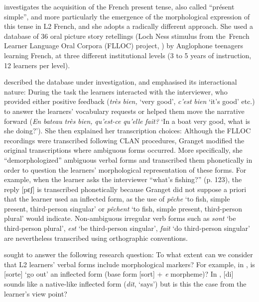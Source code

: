 \documentclass[output=paper,colorlinks,citecolor=brown,modfonts,nonflat]{../langscibook}
\begin{document}
 \citet{Granget2015} investigates the acquisition of the French present tense, also called “présent simple”, and more particularly the emergence of the morphological expression of this tense in L2 French, and she adopts a radically different approach. She used a database of 36 oral picture story retellings (Loch Ness stimulus from the~French Learner Language Oral Corpora (FLLOC) project, \citealt{MarsdenEtAl2002}) by Anglophone teenagers learning French, at three different institutional levels (3 to 5 years of instruction, 12 learners per level). 

\citet{Granget2015} described the database under investigation, and emphasised its interactional nature: During the task the learners interacted with the interviewer, who provided either positive feedback (\textit{très} \textit{bien,} ‘very good’, \textit{c’est} \textit{bien} ‘it’s good’ etc.) to answer the learners’ vocabulary requests or helped them move the narrative forward (\textit{En} \textit{bateau} \textit{très} \textit{bien,} \textit{qu’est-ce} \textit{qu’elle} \textit{fait?} ‘In a boat very good, what is she doing?’). She then explained her transcription choices: Although the FLLOC recordings were transcribed following CLAN procedures, Granget modified the original transcriptions where ambiguous forms occurred. More specifically, she “demorphologized” ambiguous verbal forms and transcribed them phonetically in order to question the learners’ morphological representation of these forms. For example, when the learner asks the interviewer “what’s fishing?” (p. 123), the reply [pɛʃ] is transcribed phonetically because Granget did not suppose a priori that the learner used an inflected form, as the use of \textit{pêche} ‘to fish, simple present, third-person singular’ or \textit{pêchent} ‘to fish, simple present, third-person plural’ would indicate. Non-ambiguous irregular verb forms such as \textit{sont} ‘be third-person plural’, \textit{est} ‘be third-person singular’, \textit{fait} ‘do third-person singular’ are nevertheless transcribed using orthographic conventions.

\citet{Granget2015} sought to answer the following research question: To what extent can we consider that L2 learners’ verbal forms include morphological markers? For example, in , is [sorte] ‘go out’ an inflected form (base form [sort] + \textit{e} morpheme)? In , [di] sounds like a native-like inflected form (\textit{dit}, ‘says’) but is this the case from the learner’s view point?
\end{document}
